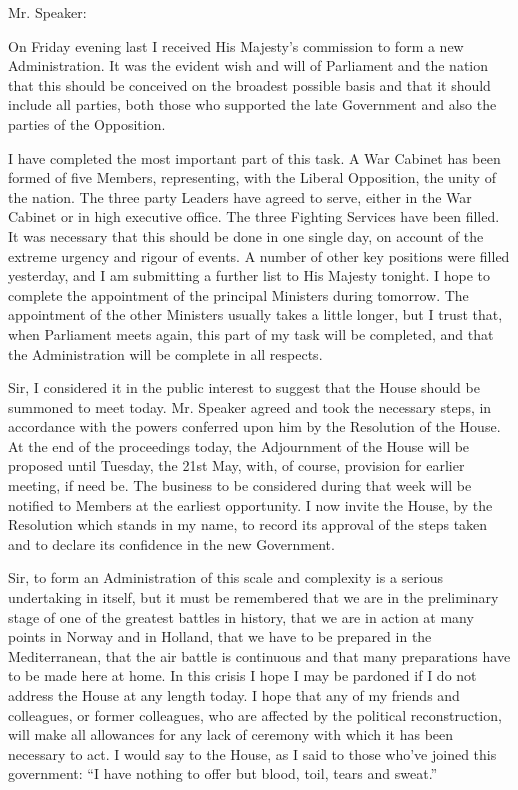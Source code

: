 \documentclass[a4paper]{amsbook}
\begin{document}
\vspace{10 mm}

Mr. Speaker:

On Friday evening last I received His Majesty's commission to form a new Administration. It was the evident wish and will of Parliament and the nation that this should be conceived on the broadest possible basis and that it should include all parties, both those who supported the late Government and also the parties of the Opposition.

I have completed the most important part of this task. A War Cabinet has been formed of five Members, representing, with the Liberal Opposition, the unity of the nation. The three party Leaders have agreed to serve, either in the War Cabinet or in high executive office. The three Fighting Services have been filled. It was necessary that this should be done in one single day, on account of the extreme urgency and rigour of events. A number of other key positions were filled yesterday, and I am submitting a further list to His Majesty tonight. I hope to complete the appointment of the principal Ministers during tomorrow. The appointment of the other Ministers usually takes a little longer, but I trust that, when Parliament meets again, this part of my task will be completed, and that the Administration will be complete in all respects.

Sir, I considered it in the public interest to suggest that the House should be summoned to meet today. Mr. Speaker agreed and took the necessary steps, in accordance with the powers conferred upon him by the Resolution of the House. At the end of the proceedings today, the Adjournment of the House will be proposed until Tuesday, the 21st May, with, of course, provision for earlier meeting, if need be. The business to be considered during that week will be notified to Members at the earliest opportunity. I now invite the House, by the Resolution which stands in my name, to record its approval of the steps taken and to declare its confidence in the new Government.

Sir, to form an Administration of this scale and complexity is a serious undertaking in itself, but it must be remembered that we are in the preliminary stage of one of the greatest battles in history, that we are in action at many points in Norway and in Holland, that we have to be prepared in the Mediterranean, that the air battle is continuous and that many preparations have to be made here at home. In this crisis I hope I may be pardoned if I do not address the House at any length today. I hope that any of my friends and colleagues, or former colleagues, who are affected by the political reconstruction, will make all allowances for any lack of ceremony with which it has been necessary to act. I would say to the House, as I said to those who've joined this government: “I have nothing to offer but blood, toil, tears and sweat.”
\end{document}
